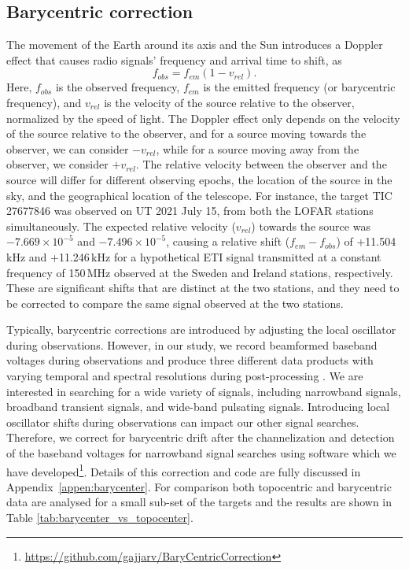 \subsection{Barycentric correction}
The movement of the Earth around its axis and the Sun introduces a Doppler effect that causes radio signals' frequency and arrival time to shift, as 
\begin{equation}
f_{obs} = f_{em} \left( 1 - v_{rel} \right).
\label{eq:doppler}
\end{equation}
Here, $f_{obs}$ is the observed frequency, $f_{em}$ is the emitted frequency (or barycentric frequency), and $v_{rel}$ is the velocity of the source relative to the observer, normalized by the speed of light. The Doppler effect only depends on the velocity of the source relative to the observer, and for a source moving towards the observer, we can consider $-v_{rel}$, while for a source moving away from the observer, we consider $+v_{rel}$. The relative velocity between the observer and the source will differ for different observing epochs, the location of the source in the sky, and the geographical location of the telescope. For instance, the target TIC\,27677846 was observed on UT 2021 July 15, from both the LOFAR stations simultaneously. The expected relative velocity ($v_{rel}$) towards the source was $-7.669\times10^{-5}$ and $-7.496\times10^{-5}$, causing a relative shift ($f_{em}-f_{obs}$) of +11.504\,kHz and +11.246\,kHz for a hypothetical ETI signal transmitted at a constant frequency of 150\,MHz observed at the Sweden and Ireland stations, respectively. These are significant shifts that are distinct at the two stations, and they need to be corrected to compare the same signal observed at the two stations. 

Typically, barycentric corrections are introduced by adjusting the local oscillator during observations. However, in our study, we record beamformed baseband voltages during observations and produce three different data products with varying temporal and spectral resolutions during post-processing \citep{2019_Lebofsky}. We are interested in searching for a wide variety of signals, including narrowband signals, broadband transient signals, and wide-band pulsating signals. Introducing local oscillator shifts during observations can impact our other signal searches. Therefore, we correct for barycentric drift after the channelization and detection of the baseband voltages for narrowband signal searches using software which we have developed\footnote{\url{https://github.com/gajjarv/BaryCentricCorrection}}. Details of this correction and code \citep{Vishal_Bary} are fully discussed in Appendix~\ref{appen:barycenter}. For comparison both topocentric and barycentric data are analysed for a small sub-set of the targets and the results are shown in Table \ref{tab:barycenter_vs_topocenter}. 


